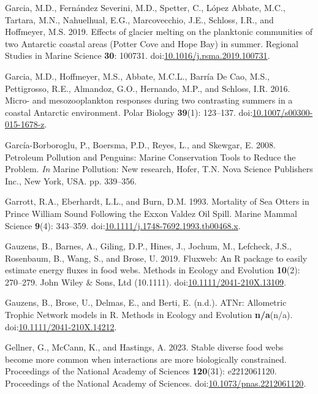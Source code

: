 \documentclass[
]{article}
\newlength{\cslhangindent}
\newenvironment{CSLReferences}[2] %
 {\begin{list}{}{%
  \setlength{\itemindent}{0pt}
  \setlength{\leftmargin}{0pt}
  \setlength{\parsep}{0pt}
  \ifodd #1
   \setlength{\leftmargin}{\cslhangindent}
   \setlength{\itemindent}{-1\cslhangindent}
  \fi
  \setlength{\itemsep}{#2\baselineskip}}}
 {\end{list}}
\begin{document}
\begin{CSLReferences}{1}{0}
Garcia, M.D., Fernández Severini, M.D., Spetter, C., López Abbate, M.C.,
Tartara, M.N., Nahuelhual, E.G., Marcovecchio, J.E., Schloss, I.R., and
Hoffmeyer, M.S. 2019. Effects of glacier melting on the planktonic
communities of two {Antarctic} coastal areas ({Potter Cove} and {Hope
Bay}) in summer. Regional Studies in Marine Science \textbf{30}: 100731.
doi:\href{https://doi.org/10.1016/j.rsma.2019.100731}{10.1016/j.rsma.2019.100731}.

Garcia, M.D., Hoffmeyer, M.S., Abbate, M.C.L., Barría De Cao, M.S.,
Pettigrosso, R.E., Almandoz, G.O., Hernando, M.P., and Schloss, I.R.
2016. Micro- and mesozooplankton responses during two contrasting
summers in a coastal {Antarctic} environment. Polar Biology
\textbf{39}(1): 123--137.
doi:\href{https://doi.org/10.1007/s00300-015-1678-z}{10.1007/s00300-015-1678-z}.

García-Borboroglu, P., Boersma, P.D., Reyes, L., and Skewgar, E. 2008.
Petroleum {Pollution} and {Penguins}: {Marine Conservation Tools} to
{Reduce} the {Problem}. \emph{In} Marine {Pollution}: {New} research,
Hofer, T.N. Nova Science Publishers Inc., New York, USA. pp. 339--356.

Garrott, R.A., Eberhardt, L.L., and Burn, D.M. 1993. Mortality of {Sea
Otters} in {Prince William Sound Following} the {Exxon Valdez Oil
Spill}. Marine Mammal Science \textbf{9}(4): 343--359.
doi:\href{https://doi.org/10.1111/j.1748-7692.1993.tb00468.x}{10.1111/j.1748-7692.1993.tb00468.x}.

Gauzens, B., Barnes, A., Giling, D.P., Hines, J., Jochum, M., Lefcheck,
J.S., Rosenbaum, B., Wang, S., and Brose, U. 2019. Fluxweb: {An R}
package to easily estimate energy fluxes in food webs. Methods in
Ecology and Evolution \textbf{10}(2): 270--279. John Wiley \& Sons, Ltd
(10.1111).
doi:\href{https://doi.org/10.1111/2041-210X.13109}{10.1111/2041-210X.13109}.

Gauzens, B., Brose, U., Delmas, E., and Berti, E. (n.d.). {ATNr}:
{Allometric Trophic Network} models in {R}. Methods in Ecology and
Evolution \textbf{n/a}(n/a).
doi:\href{https://doi.org/10.1111/2041-210X.14212}{10.1111/2041-210X.14212}.

Gellner, G., McCann, K., and Hastings, A. 2023. Stable diverse food webs
become more common when interactions are more biologically constrained.
Proceedings of the National Academy of Sciences \textbf{120}(31):
e2212061120. Proceedings of the National Academy of Sciences.
doi:\href{https://doi.org/10.1073/pnas.2212061120}{10.1073/pnas.2212061120}.


\end{CSLReferences}
\end{document}
